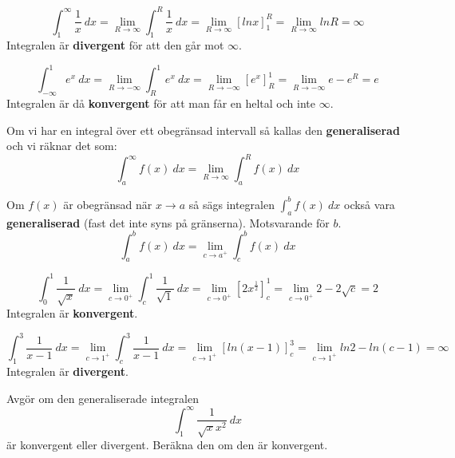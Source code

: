\documentclass{report}
\begin{document}
\pagebreak
\ex{}
{
\begin{equation*}
	\int_{1}^{ \infty} \frac{1}{x}  \: dx = \lim_{R \to \infty} \int_{1}^{R} \frac{1}{x}  \: dx = \lim_{R \to \infty} [lnx]_{1}^{R} = \lim_{R \to \infty} lnR = \infty    
\end{equation*}
Integralen är \textbf{divergent} för att den går mot $ \infty $.
}

\ex{}
{
\begin{equation*}
	\int_{- \infty}^{1} e^x \: dx = \lim_{R \to - \infty} \int_{R}^{1} e^x \: dx = \lim_{R \to - \infty} [e^x]_{R}^{1} = \lim_{R \to - \infty} e - e^R = e   
\end{equation*}
Integralen är då \textbf{konvergent} för att man får en heltal och inte $ \infty $. 
}

\vspace{20pt}
\noindent
Om vi har en integral över ett obegränsad intervall så kallas den \textbf{generaliserad} och vi räknar det som:
\begin{equation*}
\int_{a}^{ \infty} f(x) \: dx = \lim_{R \to \infty} \int_{a}^{R} f(x) \: dx  
\end{equation*}

\vspace{20pt}
\noindent
Om $ f(x) $ är obegränsad när $ x \to a $ så sägs integralen $ \int_{a}^{b} f(x) \: dx $ också vara \textbf{generaliserad} (fast det inte syns på gränserna). Motsvarande för $ b $.
\begin{equation*}
\int_{a}^{b} f(x) \: dx = \lim_{c \to a^+} \int_{c}^{b} f(x) \: dx  
\end{equation*}

\ex{}
{
\begin{equation*}
	\int_{0}^{1} \frac{1}{ \sqrt{x} }  \: dx = \lim_{c \to 0^+} \int_{c}^{1} \frac{1}{ \sqrt{1} }  \: dx = \lim_{c \to 0^+} [2x^{ \frac{1}{2} }]_{c}^{1} = \lim_{c \to 0^+} 2 - 2 \sqrt{c} = 2  
\end{equation*}
Integralen är \textbf{konvergent}. 
}

\ex{}
{
\begin{equation*}
\int_{1}^{3} \frac{1}{x-1}  \: dx = \lim_{c \to 1^+} \int_{c}^{3} \frac{1}{x-1}  \: dx = \lim_{c \to 1^+} [ln(x-1)]_{c}^{3}  = \lim_{c \to 1^+} ln2 - ln(c-1) = \infty  
\end{equation*}
Integralen är \textbf{divergent}.
}

\pagebreak
\qs{}
{
Avgör om den generaliserade integralen
\begin{equation*}
\int_{1}^{ \infty} \frac{1}{ \sqrt{x} x^2}  \: dx
\end{equation*}
är konvergent eller divergent. Beräkna den om den är konvergent.
}
\end{document}
